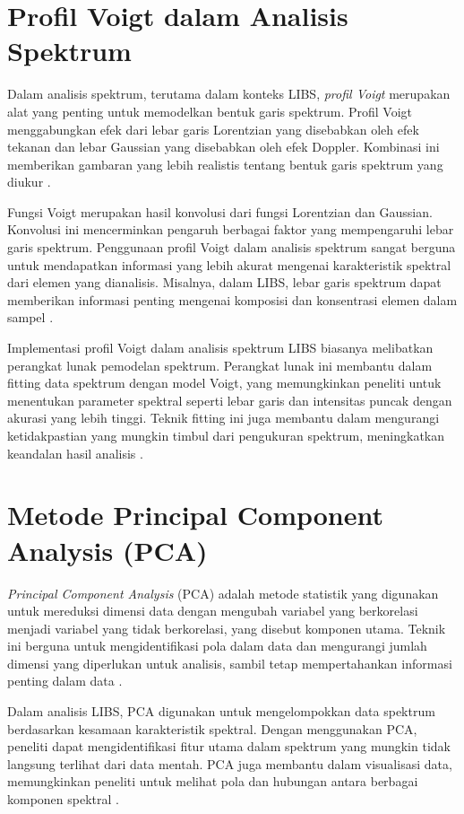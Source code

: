 \section{Profil Voigt dalam Analisis Spektrum}
\par Dalam analisis spektrum, terutama dalam konteks LIBS, \textit{profil Voigt} merupakan alat yang penting untuk memodelkan bentuk garis spektrum. Profil Voigt menggabungkan efek dari lebar garis Lorentzian yang disebabkan oleh efek tekanan dan lebar Gaussian yang disebabkan oleh efek Doppler. Kombinasi ini memberikan gambaran yang lebih realistis tentang bentuk garis spektrum yang diukur \citep{voigt1929}.

\par Fungsi Voigt merupakan hasil konvolusi dari fungsi Lorentzian dan Gaussian. Konvolusi ini mencerminkan pengaruh berbagai faktor yang mempengaruhi lebar garis spektrum. Penggunaan profil Voigt dalam analisis spektrum sangat berguna untuk mendapatkan informasi yang lebih akurat mengenai karakteristik spektral dari elemen yang dianalisis. Misalnya, dalam LIBS, lebar garis spektrum dapat memberikan informasi penting mengenai komposisi dan konsentrasi elemen dalam sampel \citep{jeong2020}.

\par Implementasi profil Voigt dalam analisis spektrum LIBS biasanya melibatkan perangkat lunak pemodelan spektrum. Perangkat lunak ini membantu dalam fitting data spektrum dengan model Voigt, yang memungkinkan peneliti untuk menentukan parameter spektral seperti lebar garis dan intensitas puncak dengan akurasi yang lebih tinggi. Teknik fitting ini juga membantu dalam mengurangi ketidakpastian yang mungkin timbul dari pengukuran spektrum, meningkatkan keandalan hasil analisis \citep{smith2020}.

\section{Metode Principal Component Analysis (PCA)}
\par \textit{Principal Component Analysis} (PCA) adalah metode statistik yang digunakan untuk mereduksi dimensi data dengan mengubah variabel yang berkorelasi menjadi variabel yang tidak berkorelasi, yang disebut komponen utama. Teknik ini berguna untuk mengidentifikasi pola dalam data dan mengurangi jumlah dimensi yang diperlukan untuk analisis, sambil tetap mempertahankan informasi penting dalam data \citep{jolliffe2002}.

\par Dalam analisis LIBS, PCA digunakan untuk mengelompokkan data spektrum berdasarkan kesamaan karakteristik spektral. Dengan menggunakan PCA, peneliti dapat mengidentifikasi fitur utama dalam spektrum yang mungkin tidak langsung terlihat dari data mentah. PCA juga membantu dalam visualisasi data, memungkinkan peneliti untuk melihat pola dan hubungan antara berbagai komponen spektral \citep{martin2020}.

